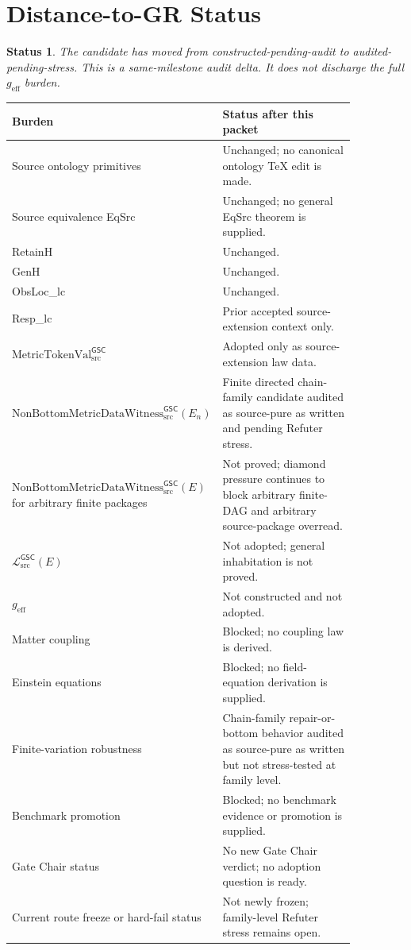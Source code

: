 \documentclass[11pt]{article}
\newcommand{\MetricTokenVal}{\mathrm{MetricTokenVal}_{\mathrm{src}}^{\mathsf{GSC}}}
\newcommand{\Witness}{\mathrm{NonBottomMetricDataWitness}_{\mathrm{src}}^{\mathsf{GSC}}}
\newcommand{\MetricData}{\mathcal{L}_{\mathrm{src}}^{\mathsf{GSC}}}
\newcommand{\geff}{g_{\mathrm{eff}}}
\newcommand{\En}{E_n}
\newtheorem{status}{Status}
\begin{document}
\section{Distance-to-GR Status}

\begin{status}
The candidate has moved from constructed-pending-audit to
audited-pending-stress. This is a same-milestone audit delta. It does not
discharge the full \(\geff\) burden.
\end{status}

\begin{longtable}{p{0.30\linewidth}p{0.56\linewidth}}
\toprule
Burden & Status after this packet \\
\midrule
Source ontology primitives & Unchanged; no canonical ontology TeX edit is made. \\
Source equivalence EqSrc & Unchanged; no general EqSrc theorem is supplied. \\
RetainH & Unchanged. \\
GenH & Unchanged. \\
ObsLoc\_lc & Unchanged. \\
Resp\_lc & Prior accepted source-extension context only. \\
\(\MetricTokenVal\) & Adopted only as source-extension law data. \\
\(\Witness(\En)\) & Finite directed chain-family candidate audited as
source-pure as written and pending Refuter stress. \\
\(\Witness(E)\) for arbitrary finite packages & Not proved; diamond pressure
continues to block arbitrary finite-DAG and arbitrary source-package overread. \\
\(\MetricData(E)\) & Not adopted; general inhabitation is not proved. \\
\(\geff\) & Not constructed and not adopted. \\
Matter coupling & Blocked; no coupling law is derived. \\
Einstein equations & Blocked; no field-equation derivation is supplied. \\
Finite-variation robustness & Chain-family repair-or-bottom behavior audited
as source-pure as written but not stress-tested at family level. \\
Benchmark promotion & Blocked; no benchmark evidence or promotion is supplied. \\
Gate Chair status & No new Gate Chair verdict; no adoption question is ready. \\
Current route freeze or hard-fail status & Not newly frozen; family-level
Refuter stress remains open. \\
\bottomrule
\end{longtable}
\end{document}
